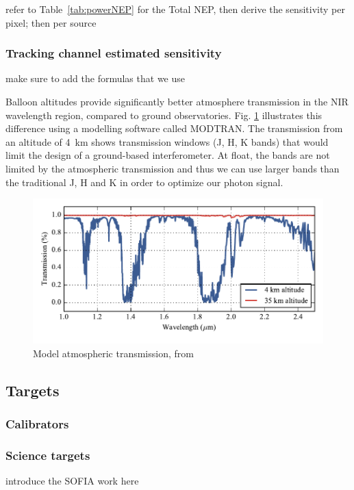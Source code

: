 refer to Table~\ref{tab:powerNEP} for the Total NEP, then derive the sensitivity per pixel; then per source


\subsubsection{Tracking channel estimated sensitivity}
make sure to add the formulas that we use

Balloon altitudes provide significantly better atmosphere transmission in the NIR wavelength region, compared to ground observatories. Fig. \ref{fig:trans} illustrates this difference using a modelling software called MODTRAN. The transmission from an altitude of 4~km shows transmission windows (J, H, K bands) that would limit the design of a ground-based interferometer. At float, the bands are not limited by the atmospheric transmission and thus we can use larger bands than the traditional J, H and K in order to optimize our photon signal.

\begin{figure}[ht!]
\begin{center}
\includegraphics[width=\textwidth]{Figures/BETTII_atmo_transmission.pdf}
\caption{Model atmospheric transmission, from \cite{Rizzo:2012jp}}
\label{fig:trans}
\end{center}
\end{figure}


\subsection{Targets}


\subsubsection{Calibrators}


\subsubsection{Science targets}
introduce the SOFIA work here

